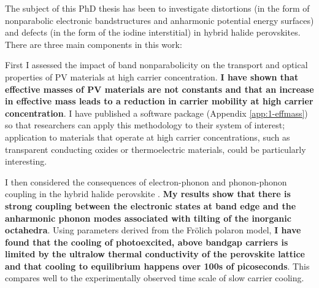 The subject of this PhD thesis has been to investigate distortions (in the form of nonparabolic electronic bandstructures and anharmonic potential energy surfaces) and defects (in the form of the iodine interstitial) in hybrid halide perovskites. There are three main components in this work:

First I assessed the impact of band nonparabolicity on the transport and optical properties of PV materials at high carrier concentration. \textbf{I have shown that effective masses of PV materials are not constants and that an increase in effective mass leads to a reduction in carrier mobility at high carrier concentration}. I have published a software package (Appendix \ref{app:1-effmass}) so that researchers can apply this methodology to their system of interest; application to materials that operate at high carrier concentrations, such as transparent conducting oxides or thermoelectric materials, could be particularly interesting.

I then considered the consequences of electron-phonon and phonon-phonon coupling in the hybrid halide perovskite . \textbf{My results show that there is strong coupling between the electronic states at band edge and the anharmonic phonon modes associated with tilting of the inorganic octahedra}. Using parameters derived from the Fr\"{o}lich polaron model, \textbf{I have found that the cooling of photoexcited, above bandgap carriers is limited by the ultralow thermal conductivity of the perovskite lattice and that cooling to equilibrium happens over 100s of picoseconds}. This compares well to the experimentally observed time scale of slow carrier cooling.

